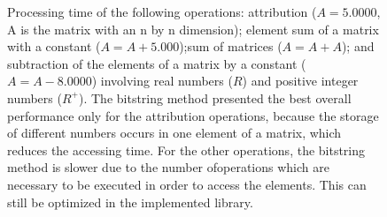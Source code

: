 \documentclass[10pt]{article}
\begin{document}
\begin{figure}[h]
{  }
  \caption{Processing time of the following operations: attribution ($A=5.0000$, A is the matrix with an n by n dimension); 
  element sum of a matrix with a constant ($A=A+5.000$);sum of matrices ($A=A+A$); and subtraction of the elements of a 
  matrix by a constant ($A=A-8.0000$) involving real numbers ($R$) and positive integer numbers ($R^+$). The bitstring 
  method presented the best overall performance only for the attribution operations, because the storage of 
  different numbers occurs in one element of a matrix, which reduces the accessing time. For the other operations, 
  the bitstring method is slower due to the number ofoperations which are necessary to be  executed in order to 
  access the elements. This can still be optimized in the implemented library.}
  \label{fig:31323334}
\end{figure}
\end{document}
